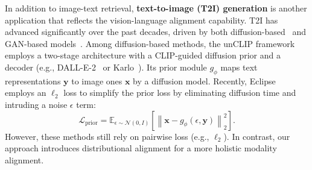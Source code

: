 In addition to image-text retrieval, \textbf{text-to-image (T2I) generation} is another application that reflects the vision-language alignment capability. 
T2I has advanced significantly over the past decades, driven by both diffusion-based~\citep{ramesh2021zero, rombach2022high, saharia2022photorealistic, nichol2021glide} and GAN-based models~\citep{zhang2017stackgan, tao2023galip}. 
Among diffusion-based methods, the unCLIP framework~\citep{ramesh2021zero, ramesh2022hierarchical} employs a two-stage architecture with a CLIP-guided diffusion prior and a decoder (e.g., DALL-E-2~\citep{ramesh2022hierarchical} or Karlo~\citep{kakaobrain2022karlo-v1-alpha}). Its prior module \( g_\phi\)
maps text representations $\mathbf{y}$ to image ones $\mathbf{x}$ by a diffusion model. 
Recently, 
Eclipse~\citep{patel2024eclipse} employs an $\ell_2$ loss to simplify the prior loss by eliminating diffusion time and intruding a noise $\epsilon$ term:
\begin{equation}
\mathcal{L}_{\text{prior}} = \mathbb{E}_{\epsilon \sim \mathcal{N}(0,I)} 
\left[ \left\| \mathbf{x} - g_{\phi}(\epsilon, \mathbf{y}) \right\|_2^2 \right].
\label{eq:prior_loss}
\end{equation}
However, these methods still rely on pairwise loss (e.g., $\ell_2$). In contrast, our approach introduces distributional alignment for a more holistic modality alignment.


